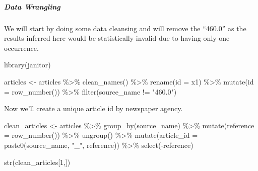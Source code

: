 \documentclass[
]{article}
\newenvironment{Shaded}{\begin{snugshade}}{\end{snugshade}}
\newcommand{\AttributeTok}[1]{\textcolor[rgb]{0.77,0.63,0.00}{#1}}
\newcommand{\DecValTok}[1]{\textcolor[rgb]{0.00,0.00,0.81}{#1}}
\newcommand{\FunctionTok}[1]{\textcolor[rgb]{0.00,0.00,0.00}{#1}}
\newcommand{\NormalTok}[1]{#1}
\newcommand{\OtherTok}[1]{\textcolor[rgb]{0.56,0.35,0.01}{#1}}
\newcommand{\SpecialCharTok}[1]{\textcolor[rgb]{0.00,0.00,0.00}{#1}}
\newcommand{\StringTok}[1]{\textcolor[rgb]{0.31,0.60,0.02}{#1}}
\begin{document}
\hypertarget{data-wrangling}{%
\subparagraph{\texorpdfstring{\textbf{Data
Wrangling}}{Data Wrangling}}\label{data-wrangling}}

We will start by doing some data cleansing and will remove the ``460.0''
as the results inferred here would be statistically invalid due to
having only one occurrence.

\begin{Shaded}
\begin{Highlighting}[]
\FunctionTok{library}\NormalTok{(janitor)}

\NormalTok{articles }\OtherTok{\textless{}{-}}\NormalTok{ articles }\SpecialCharTok{\%\textgreater{}\%}
            \FunctionTok{clean\_names}\NormalTok{() }\SpecialCharTok{\%\textgreater{}\%}
            \FunctionTok{rename}\NormalTok{(}\AttributeTok{id =}\NormalTok{ x1) }\SpecialCharTok{\%\textgreater{}\%}
            \FunctionTok{mutate}\NormalTok{(}\AttributeTok{id =} \FunctionTok{row\_number}\NormalTok{()) }\SpecialCharTok{\%\textgreater{}\%}
            \FunctionTok{filter}\NormalTok{(source\_name }\SpecialCharTok{!=} \StringTok{"460.0"}\NormalTok{)}
\end{Highlighting}
\end{Shaded}

Now we'll create a unique article id by newspaper agency.

\begin{Shaded}
\begin{Highlighting}[]
\NormalTok{clean\_articles }\OtherTok{\textless{}{-}}\NormalTok{ articles }\SpecialCharTok{\%\textgreater{}\%}
                 \FunctionTok{group\_by}\NormalTok{(source\_name) }\SpecialCharTok{\%\textgreater{}\%}
                 \FunctionTok{mutate}\NormalTok{(}\AttributeTok{reference =} \FunctionTok{row\_number}\NormalTok{()) }\SpecialCharTok{\%\textgreater{}\%}
                 \FunctionTok{ungroup}\NormalTok{() }\SpecialCharTok{\%\textgreater{}\%}
                 \FunctionTok{mutate}\NormalTok{(}\AttributeTok{article\_id =} \FunctionTok{paste0}\NormalTok{(source\_name, }\StringTok{"\_"}\NormalTok{, reference)) }\SpecialCharTok{\%\textgreater{}\%}
                 \FunctionTok{select}\NormalTok{(}\SpecialCharTok{{-}}\NormalTok{reference)}

\FunctionTok{str}\NormalTok{(clean\_articles[}\DecValTok{1}\NormalTok{,])}
\end{Highlighting}
\end{Shaded}
\end{document}
